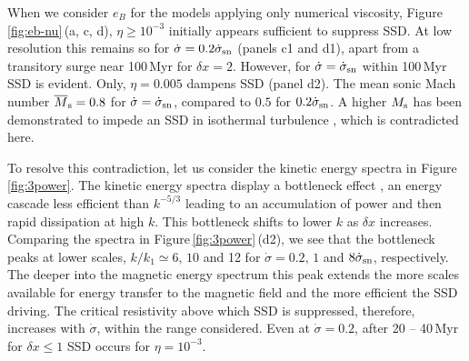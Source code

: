 \documentclass[preprint2]{aastex63}
\newcommand\SNr{\dot\sigma_{\rm sn}}
\newcommand\Ms{M_{\rm s}}
\newcommand\pc{~ {\rm pc}}
\newcommand\dx{ {\delta x}}
\newcommand{\fg}[1]{\textcolor{midgreen}{#1}}
\begin{document}
 \fg{When we consider $e_B$ for the models applying only numerical
 viscosity,
 Figure\,\ref{fig:eb-nu}\,(a, c, d), $\eta\geq10^{-3}$ initially appears
 sufficient to suppress SSD.
 At low resolution this remains so for $\dot\sigma=0.2\SNr$ (panels c1 and d1),
 apart from a transitory surge near 100\,Myr for $\dx=2$.
 However, for $\dot\sigma=\SNr$ within 100\,Myr SSD is evident.
 Only, $\eta=0.005$ dampens SSD (panel d2).}
 The mean sonic Mach number $\overline\Ms=0.8$ for $\dot\sigma=\SNr$, compared
 to $0.5$ for $0.2\SNr$.
 A higher $\Ms$ has been demonstrated to impede an SSD in isothermal turbulence
 \citep{Haugen:2004M}, which is contradicted here.

 \fg{To resolve this contradiction, let us consider the 
 kinetic energy spectra in Figure\,\ref{fig:3power}.}
 The kinetic energy spectra display a bottleneck effect
 \citep{Falkovich94,HBD03}, an energy cascade less efficient than $k^{-5/3}$
 leading to an accumulation of power and then rapid dissipation at high $k$.
 This bottleneck shifts to lower $k$ as $\dx$ increases.
 \fg{Comparing the spectra in Figure\,\ref{fig:3power}\,(d2), we
 see that the bottleneck peaks at lower scales, $k/k_1\simeq6,\,10$ and 12 for
 $\dot\sigma=0.2,\,1$ and $8\SNr$, respectively.
 The deeper into the magnetic energy spectrum this peak extends the more 
 scales available for energy transfer to the magnetic field and the more
 efficient the SSD driving.
 The critical resistivity above which SSD is suppressed, therefore, 
 increases with $\dot\sigma$, within the range considered. 
 Even at $\dot\sigma=0.2$, after 20 -- 40\,Myr for $\dx\leq1$ SSD occurs for
 $\eta=10^{-3}$.
}

\end{document}
